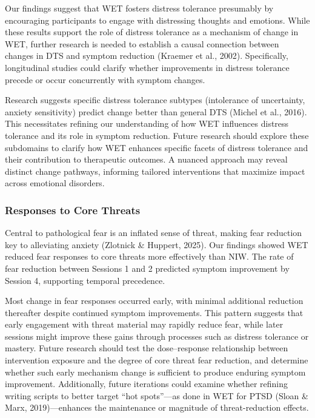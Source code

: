 \documentclass[
  man,floatsintext]{apa7}
\begin{document}
Our findings suggest that WET fosters distress tolerance presumably by encouraging participants to engage with distressing thoughts and emotions.
While these results support the role of distress tolerance as a mechanism of change in WET, further research is needed to establish a causal connection between changes in DTS and symptom reduction (Kraemer et al., 2002).
Specifically, longitudinal studies could clarify whether improvements in distress tolerance precede or occur concurrently with symptom changes.

Research suggests specific distress tolerance subtypes (intolerance of uncertainty, anxiety sensitivity) predict change better than general DTS (Michel et al., 2016).
This necessitates refining our understanding of how WET influences distress tolerance and its role in symptom reduction.
Future research should explore these subdomains to clarify how WET enhances specific facets of distress tolerance and their contribution to therapeutic outcomes.
A nuanced approach may reveal distinct change pathways, informing tailored interventions that maximize impact across emotional disorders.

\subsubsection{Responses to Core Threats}\label{responses-to-core-threats}

Central to pathological fear is an inflated sense of threat, making fear reduction key to alleviating anxiety (Zlotnick \& Huppert, 2025).
Our findings showed WET reduced fear responses to core threats more effectively than NIW.
The rate of fear reduction between Sessions 1 and 2 predicted symptom improvement by Session 4, supporting temporal precedence.

Most change in fear responses occurred early, with minimal additional reduction thereafter despite continued symptom improvements.
This pattern suggests that early engagement with threat material may rapidly reduce fear, while later sessions might improve these gains through processes such as distress tolerance or mastery.
Future research should test the dose--response relationship between intervention exposure and the degree of core threat fear reduction, and determine whether such early mechanism change is sufficient to produce enduring symptom improvement.
Additionally, future iterations could examine whether refining writing scripts to better target ``hot spots''---as done in WET for PTSD (Sloan \& Marx, 2019)---enhances the maintenance or magnitude of threat-reduction effects.
\end{document}
